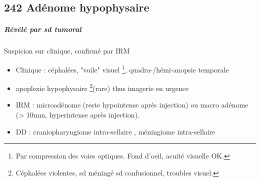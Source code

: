 \documentclass[11pt]{article}
\begin{document}
\subsection{242 Adénome hypophysaire}
\label{sec:org2aa5455}
\subparagraph{Révélé par sd tumoral}
\label{sec:orga79a85a}
Suspicion sur clinique, confirmé par IRM
\begin{itemize}
\item Clinique : céphalées, "voile" visuel \footnote{Par compression des voies optiques. Fond d'oeil,
acuité visuelle OK.}, quadra-/hémi-anopsie temporale
\item \danger apoplexie hypophysaire \footnote{Céphalées violentes, sd méningé sd confusionnel, troubles visuel.}(rare) thus imagerie en urgence \danger
\item IRM : microadénome (reste hypointense après injection) ou macro adénome (>
10mm, hyperintense après injection).
\item DD : craniopharyngiome intra-sellaire , méningiome intra-sellaire
\end{itemize}
\end{document}
